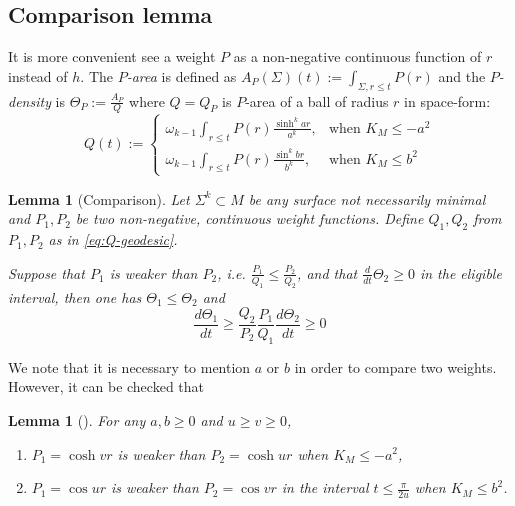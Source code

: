 \documentclass[11pt]{article}
\newtheorem{lemma}[theorem]{Lemma}
\begin{document}
\subsection{Comparison lemma}
\label{sec:orgc9ef313}
It is more convenient see a weight \(P\) as a non-negative
continuous function of \(r\) instead of \(h\). The \emph{\(P\)-area} is defined as \(A_P(\Sigma)(t):= \int_{\Sigma, r\leq t}P(r)\) and the \emph{\(P\)-density} is \(\Theta_P:= \frac{A_P}{Q}\) where \(Q = Q_P\) is
\(P\)-area of a ball of radius \(r\) in space-form:
\begin{equation}
\label{eq:Q-geodesic}
 Q(t):= \begin{cases}
\omega_{k-1}\int_{r\leq t}P(r)\frac{\sinh^k ar}{a^k}       ,  & \text{when } K_M\leq -a^2 \\
\omega_{k-1}\int_{r\leq t}P(r)\frac{\sin^k br}{b^k}       , & \text{when } K_M\leq b^2
       \end{cases}
\end{equation}

\begin{lemma}[Comparison]
\label{lem:comparison-geodesic}
Let \(\Sigma^k\subset M\) be any surface not necessarily minimal and \(P_1,P_2\) be two
non-negative, continuous weight functions. Define \(Q_1, Q_2\) from \(P_1,
P_2\) as in \eqref{eq:Q-geodesic}. 

Suppose that \(P_1\) is weaker than \(P_2\), i.e. \(\frac{P_1}{Q_1} \leq
\frac{P_2}{Q_2}\), and that \(\frac{d}{dt}\Theta_2\geq 0\) in the eligible interval, then one has \(\Theta_1\leq\Theta_2\)
and
\[
\frac{d\Theta_1}{dt} \geq \frac{Q_2}{P_2}\frac{P_1}{Q_1} \frac{d\Theta_2}{dt}\geq 0
\]
\end{lemma}

We note that it is necessary to mention \(a\) or \(b\) in order to compare two
weights. However, it can be checked that
\begin{lemma}[]
\label{lem:compare-geodesic}
For any \(a, b\geq 0\) and \(u\geq v \geq 0\),
\begin{enumerate}
\item \(P_1 = \cosh v r\) is weaker than \(P_2 = \cosh ur\) when \(K_M\leq -a^2\),
\item \(P_1 = \cos ur\) is weaker than \(P_2 = \cos vr\) in the interval \(t \leq \frac{\pi}{2u}\) when \(K_M\leq b^2\).
\end{enumerate}
\end{lemma}
\end{document}
